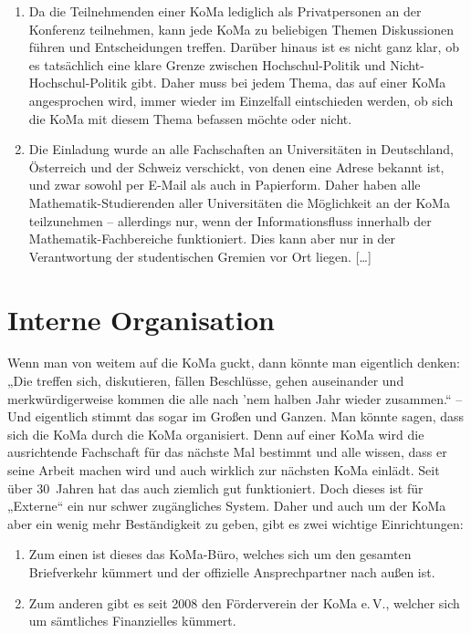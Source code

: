 \documentclass{neulingsheft}
\begin{document}
{\begin{enumerate}
\item Da die Teilnehmenden einer KoMa lediglich als Privatpersonen an der
	Konferenz teilnehmen, kann jede KoMa zu beliebigen Themen Diskussionen
	führen und Entscheidungen treffen. Darüber hinaus ist es nicht ganz
	klar, ob es tatsächlich eine klare Grenze zwischen Hochschul-Politik
	und Nicht-Hochschul-Politik gibt. Daher muss bei jedem Thema, das auf
	einer KoMa angesprochen wird, immer wieder im Einzelfall eintschieden
	werden, ob sich die KoMa mit diesem Thema befassen möchte oder nicht.

\item Die Einladung wurde an alle Fachschaften an Universitäten in
	Deutschland, Österreich und der Schweiz verschickt, von denen eine
	Adrese bekannt ist, und zwar sowohl per E-Mail als auch in Papierform.
	Daher haben alle Mathematik-Studierenden aller Universitäten die
	Möglichkeit an der KoMa teilzunehmen – allerdings nur, wenn der
	Informationsfluss innerhalb der Mathematik-Fachbereiche funktioniert.
	Dies kann aber nur in der Verantwortung der studentischen Gremien vor
	Ort liegen.  [\dots]
\end{enumerate}

\chapter{Interne Organisation}

Wenn man von weitem auf die KoMa guckt, dann könnte man
eigentlich denken: „Die treffen sich, diskutieren, fällen Beschlüsse,
gehen auseinander und merkwürdigerweise kommen die alle nach
'nem halben Jahr wieder zusammen.“ – Und eigentlich stimmt
das sogar im Großen und Ganzen. Man könnte sagen, dass sich
die KoMa durch die KoMa organisiert. Denn auf einer KoMa
wird die ausrichtende Fachschaft für das nächste Mal bestimmt
und alle wissen, dass er seine Arbeit machen wird und auch
wirklich zur nächsten KoMa einlädt. Seit über 30~Jahren hat %
das auch ziemlich gut funktioniert.
Doch dieses ist für „Externe“ ein nur schwer zugängliches System.
Daher und auch um der KoMa aber ein wenig mehr Beständigkeit
zu geben, gibt es zwei wichtige Einrichtungen:

\begin{enumerate}
	\item Zum einen ist dieses das KoMa-Büro, welches sich um den gesamten
		Briefverkehr kümmert und der offizielle Ansprechpartner nach außen ist.
	\item Zum anderen gibt es seit 2008 den Förderverein der KoMa e.\,V.,
		welcher sich um sämtliches Finanzielles kümmert.
\end{enumerate}

}
\end{document}
